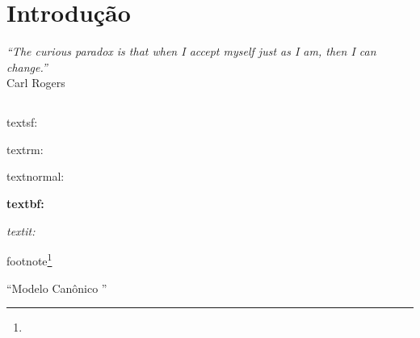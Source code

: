 

\cleardoublepage
{} %



\chapter[Introdução]{Introdução \showfont}




\begin{flushright}
	\textit{``The curious paradox is that when I accept myself just as I am, then I can change.''}\\
	Carl Rogers
\end{flushright}




\newpage


\section[Some encoding tests]{\showfont}
\subsection{\showfont}
\subsubsection{\showfont}
\subsubsubsection{\showfont}


\textsf{textsf: \showfont}

\textrm{textrm: \showfont}

\textnormal{textnormal: \showfont}

\sloppy
\textbf{textbf: \showfont}
\fussy

\textit{textit: \showfont}

footnote\footnote{\showfont}


``Modelo Canônico \showfont''

